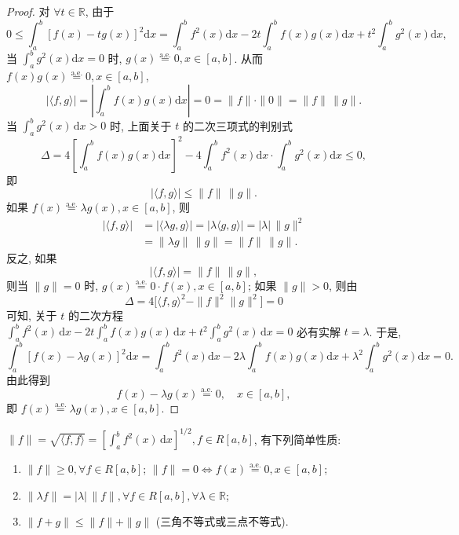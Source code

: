 \begin{proof}
对 $\forall t \in \mathbb{R}$, 由于
\[
  0\leqslant\int_{a}^{b}\left[f(x)-tg(x)\right]^{2}\mathrm{d}x=\int_{a}^{b}f^{2}(x)\mathrm{d}x-2t\int_{a}^{b}f(x)g(x)\mathrm{d}x+t^{2}\int_{a}^{b}g^{2}(x)\mathrm{d}x,
\]
当 $\int_{a}^{b}g^{2}(x)\mathrm{d}x=0$ 时, $g(x)\overset{\mathrm{a.e.}}{=}0,x\in[a,b]$. 从而 $f(x)g(x)\overset{\mathrm{a.e.}}{=}0,x\in[a,b]$,
\[
  |\langle f,g\rangle|=\left|\int_{a}^{b}f(x)g(x)\mathrm{d}x\right|=0=\|f\|\cdot\|0\|=\|f\|\,\|g\|.
\]
当 $\int_{a}^{b} g^{2}(x) \,\mathrm{d}x > 0$ 时, 上面关于 $t$ 的二次三项式的判别式
\[
  \Delta=4\left[\int_{a}^{b}f(x)g(x)\mathrm{d}x\right]^{2}-4\int_{a}^{b}f^{2}(x)\mathrm{d}x\cdot\int_{a}^{b}g^{2}(x)\mathrm{d}x\leqslant0,
\]
即
\[
  |\langle f,g\rangle|\leqslant\| f\|\,\| g\|.
\]
如果 $f(x)\overset{\mathrm{a.e.}}{=}\lambda g(x),x\in[a,b]$, 则
\[
  \begin{aligned}
    |\langle f,g\rangle|&=|\langle\lambda g,g\rangle|=|\lambda\langle g,g\rangle|=|\lambda|\,\|g\|^{2}\\
    &=\|\lambda g\|\,\|g\|=\|f\|\,\|g\|.
  \end{aligned}
\]
反之, 如果
\[
  |\langle f,g\rangle|=\| f\|\,\| g\|,
\]
则当 $\| g \| = 0$ 时, $g(x) \overset{\mathrm{a.e.}}{=} 0 \cdot f(x), x \in [a, b]$; 如果 $\| g \| > 0$, 则由
\[
  \Delta=4\bigl[\langle f,g\rangle^{2}-\| f\|^{2}\| g\|^{2}\bigr]=0
\]
可知, 关于 $t$ 的二次方程 $\int_{a}^{b} f^{2}(x) \, \mathrm{d}x - 2t \int_{a}^{b} f(x) g(x) \, \mathrm{d}x + t^{2} \int_{a}^{b} g^{2}(x) \, \mathrm{d}x = 0$ 必有实解 $t = \lambda$. 于是,
\[
  \int_{a}^{b}\left[f(x)-\lambda g(x)\right]^{2}\mathrm{d}x=\int_{a}^{b}f^{2}(x)\mathrm{d}x-2\lambda\int_{a}^{b}f(x)g(x)\mathrm{d}x+\lambda^{2}\int_{a}^{b}g^{2}(x)\mathrm{d}x=0.
\]
由此得到
\[
  f(x)-\lambda g(x)\overset{\mathrm{a.e.}}{=}0,\quad x\in[a,b],
\]
即 $f(x)\overset{\mathrm{a.e.}}{=}\lambda g(x),x\in[a,b]$.
\end{proof}

\begin{theorem}\label{thm:16.2.3}
$\| f \| = \sqrt{\langle f, f \rangle} = \left[ \int_{a}^{b} f^{2}(x) \, \mathrm{d}x \right]^{1/2}, f \in R[a, b]$, 有下列简单性质:
\begin{enumerate}
  \item $\| f \| \geqslant 0, \forall f \in R[a,b]$; $\| f \| = 0 \iff f(x)\overset{\mathrm{a.e.}}{=}0, x \in [a,b]$;
  \item $\|\lambda f\| = |\lambda|\,\|f\|, \forall f \in R[a, b], \forall \lambda \in \mathbb{R}$;
  \item $\| f + g \| \leqslant \| f \| + \| g \|$ (三角不等式或三点不等式).
\end{enumerate}
\end{theorem}

